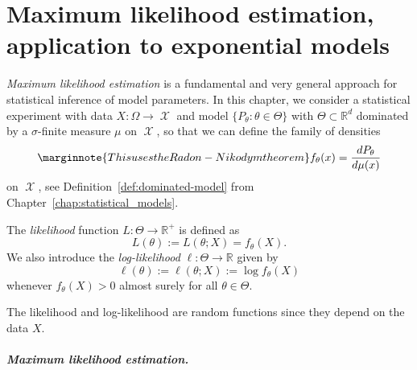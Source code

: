 \documentclass[
	fontsize=11pt, %
	twoside=false, %
	numbers=noenddot, %
]{kaobook}
\DeclareMathOperator{\cX}{{\mathcal X}}
\newcommand{\R}{\mathbb R}
\newcommand{\go}{\rightarrow}
\begin{document}
\mainmatter %






% 

% 

% 

% 


\setchapterpreamble[u]{\margintoc}
\chapter{Maximum likelihood estimation, application to exponential models}
\label{chap:maximum_likelihood_estimation}


\emph{Maximum likelihood estimation} is a fundamental and very general approach for statistical inference of model parameters.
In this chapter, we consider a statistical experiment with data $X : \Omega \go \cX$ and model $\{ P_\theta : \theta \in \Theta \}$ with $\Theta \subset \R^d$ dominated by a $\sigma$-finite measure $\mu$ on $\cX$, so that we can define the family of densities 
\begin{equation*}
	\marginnote{This uses the Radon-Nikodym theorem}
	f_\theta(x) = \frac{d P_\theta}{d \mu (x)} 
\end{equation*}
on $\cX$, see Definition~\ref{def:dominated-model} from Chapter~\ref{chap:statistical_models}.
\begin{definition}
	The \emph{likelihood} function $L : \Theta \go \R^+$ is defined as
	\begin{equation*}
		L(\theta) := L(\theta; X) = f_\theta(X).
	\end{equation*}
	We also introduce the \emph{log-likelihood} $\ell : \Theta \go \R$ given by
	\begin{equation*}
		\ell(\theta) := \ell(\theta; X) := \log f_\theta(X)
	\end{equation*}
	whenever $f_\theta(X) > 0$ almost surely for all $\theta \in \Theta$.
\end{definition}
The likelihood and log-likelihood are random functions since they depend on the data $X$.


\paragraph{Maximum likelihood estimation.} %
\end{document}
